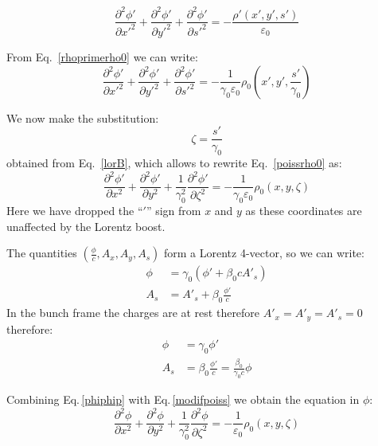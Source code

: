 \begin{equation}
\frac{\partial^2 \phi'}{\partial x'^2} +  \frac{\partial^2 \phi'}{\partial y'^2}+  \frac{\partial^2 \phi'}{\partial s'^2}= -\frac{\rho' (x', y', s')}{\varepsilon_0}
\end{equation}

From Eq.~\ref{rhoprimerho0} we can write:
\begin{equation}
\frac{\partial^2 \phi'}{\partial x'^2} +  \frac{\partial^2 \phi'}{\partial y'^2}+  \frac{\partial^2 \phi'}{\partial s'^2}= -\frac{1}{\gamma_0\varepsilon_0}  \rho_0 \left(x', y', \frac{s'}{\gamma_0}\right)\label{poissrho0}
\end{equation}

We now make the substitution:
\begin{equation}
\zeta = \frac{s'}{\gamma_0} \label{subst}
\end{equation}
obtained from Eq.~\ref{lorB}, which allows to rewrite Eq.~\ref{poissrho0} as:
\begin{equation}
\frac{\partial^2 \phi'}{\partial x^2} +  \frac{\partial^2 \phi'}{\partial y^2}+  \frac{1}{\gamma_0^2}\frac{\partial^2 \phi'}{\partial \zeta^2}=  -\frac{1}{\gamma_0\varepsilon_0}{\rho}_0 \left(x, y,\zeta\right) \label{modifpoiss}
\end{equation}
Here we have dropped the ``$'$'' sign from $x$ and $y$ as these coordinates are unaffected by the Lorentz boost.




The quantities $\left( \frac{\phi}{c}, A_x, A_y, A_s\right)$ form a Lorentz 4-vector, so we can write:
\begin{align}
\phi &= \gamma_0 \left( {\phi'} +  \beta_0 c A'_s\right)\\
A_s &= A'_s +\beta_0 \frac{\phi'}{c}
\end{align}
In the bunch frame the charges are at rest therefore $A'_x=A'_y=A'_s=0$ therefore:
\begin{align}
\phi &= \gamma_0 \phi'\label{phiphip}\\
A_s &= \beta_0 \frac{\phi'}{c} =  \frac{\beta_0}{\gamma_0c}\phi
\end{align}

Combining Eq.\,\ref{phiphip} with Eq.\,\ref{modifpoiss} we obtain the equation in $\phi$:
\begin{equation}
\boxed{
\frac{\partial^2 \phi}{\partial x^2} +  \frac{\partial^2 \phi}{\partial y^2}+  \frac{1}{\gamma_0^2}\frac{\partial^2 \phi}{\partial \zeta^2}=  -\frac{1}{\varepsilon_0}{\rho}_0 \left(x, y,\zeta\right)} \label{modifpoiss_zeta}
\end{equation}

